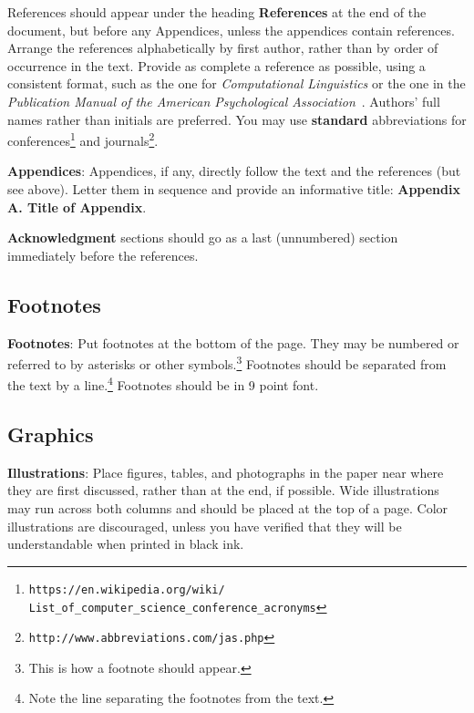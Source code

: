 \documentclass[11pt,letterpaper]{article}
\newcommand\BibTeX{B{\sc ib}\TeX}
\begin{document}
References should appear under the heading {\bf References} at the 
end of the document, but before any Appendices, unless the appendices contain references.  
Arrange the references alphabetically
by first author, rather than by order of occurrence in the text.  %
Provide as complete a reference as possible, using a consistent format,
such as the one for {\em Computational Linguistics\/} or the one in the 
{\em Publication Manual of the American 
Psychological Association\/}~\cite{APA:83}.  Authors' full names rather than initials are preferred.  You may use
{\bf standard} abbreviations for conferences\footnote{\scriptsize {\tt https://en.wikipedia.org/wiki/ \\ \-\hspace{.75cm} List\_of\_computer\_science\_conference\_acronyms}} and journals\footnote{\tt http://www.abbreviations.com/jas.php}.




{\bf Appendices}: Appendices, if any, directly follow the text and the
references (but see above).  Letter them in sequence and provide an
informative title: {\bf Appendix A. Title of Appendix}.

\textbf{Acknowledgment} sections should go as a last (unnumbered) section immediately
before the references.  


\subsection{Footnotes}

{\bf Footnotes}: Put footnotes at the bottom of the page. They may
be numbered or referred to by asterisks or other
symbols.\footnote{This is how a footnote should appear.} Footnotes
should be separated from the text by a line.\footnote{Note the
line separating the footnotes from the text.}  Footnotes should be in 9 point font.

\subsection{Graphics}

{\bf Illustrations}: Place figures, tables, and photographs in the
paper near where they are first discussed, rather than at the end, if
possible.  Wide illustrations may run across both columns and should be placed at
the top of a page. Color illustrations are discouraged, unless you have verified that 
they will be understandable when printed in black ink. 
\end{document}
